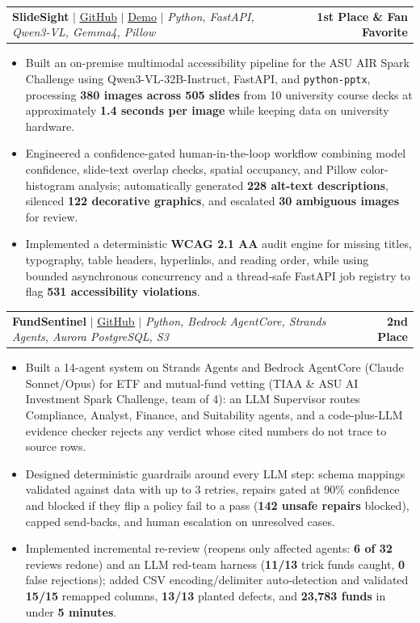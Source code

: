 \documentclass[letterpaper,11pt]{article}
\makeatletter
\newcommand{\resumeItem}[1]{
  \item\small{
    {#1 \vspace{-2pt}}
  }
}
\newcommand{\resumeProjectHeading}[2]{
    \item
    \begin{tabular*}{0.97\textwidth}{l@{\extracolsep{\fill}}r}
      \small#1 & #2 \\
    \end{tabular*}\vspace{-7pt}
}
\newcommand{\resumeItemListStart}{\begin{itemize}}
\newcommand{\resumeItemListEnd}{\end{itemize}\vspace{-5pt}}
\makeatother
\begin{document}
      \resumeProjectHeading
  {\textbf{SlideSight} $|$
   \href{https://github.com/smanika3/ASU-AIR-SlideSight}{\underline{GitHub}} $|$
   \href{https://youtu.be/GsoHh9ocpWg}{\underline{Demo}} $|$
   \emph{Python, FastAPI, Qwen3-VL, Gemma4, Pillow}}
  {\textbf{1st Place \& Fan Favorite}}
      \resumeItemListStart
        \resumeItem{Built an on-premise multimodal accessibility pipeline for the ASU AIR Spark Challenge using Qwen3-VL-32B-Instruct, FastAPI, and \texttt{python-pptx}, processing \textbf{380 images across 505 slides} from 10 university course decks at approximately \textbf{1.4 seconds per image} while keeping data on university hardware.}
        \resumeItem{Engineered a confidence-gated human-in-the-loop workflow combining model confidence, slide-text overlap checks, spatial occupancy, and Pillow color-histogram analysis; automatically generated \textbf{228 alt-text descriptions}, silenced \textbf{122 decorative graphics}, and escalated \textbf{30 ambiguous images} for review.}
        \resumeItem{Implemented a deterministic \textbf{WCAG 2.1 AA} audit engine for missing titles, typography, table headers, hyperlinks, and reading order, while using bounded asynchronous concurrency and a thread-safe FastAPI job registry to flag \textbf{531 accessibility violations}.}
      \resumeItemListEnd

    \resumeProjectHeading
      {\textbf{FundSentinel} $|$
       \href{https://github.com/smanika3/FundSentinel}{\underline{GitHub}} $|$
       \emph{Python, Bedrock AgentCore, Strands Agents, Aurora PostgreSQL, S3}}
      {\textbf{2nd Place}}
      \resumeItemListStart
        \resumeItem{Built a 14-agent system on Strands Agents and Bedrock AgentCore (Claude Sonnet/Opus) for ETF and mutual-fund vetting (TIAA \& ASU AI Investment Spark Challenge, team of 4): an LLM Supervisor routes Compliance, Analyst, Finance, and Suitability agents, and a code-plus-LLM evidence checker rejects any verdict whose cited numbers do not trace to source rows.}
        \resumeItem{Designed deterministic guardrails around every LLM step: schema mappings validated against data with up to 3 retries, repairs gated at 90\% confidence and blocked if they flip a policy fail to a pass (\textbf{142 unsafe repairs} blocked), capped send-backs, and human escalation on unresolved cases.}
        \resumeItem{Implemented incremental re-review (reopens only affected agents: \textbf{6 of 32} reviews redone) and an LLM red-team harness (\textbf{11/13} trick funds caught, \textbf{0} false rejections); added CSV encoding/delimiter auto-detection and validated \textbf{15/15} remapped columns, \textbf{13/13} planted defects, and \textbf{23,783 funds} in under \textbf{5 minutes}.}
      \resumeItemListEnd
\end{document}
